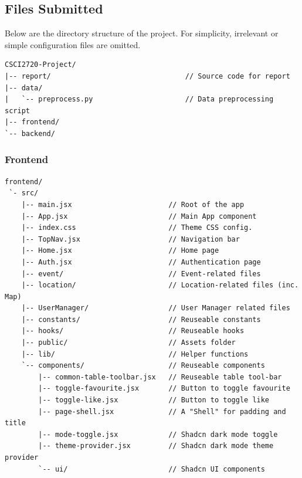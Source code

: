\subsection{Files Submitted}
Below are the directory structure of the project.
For simplicity, irrelevant or simple configuration files are omitted.
\begin{verbatim}
CSCI2720-Project/
|-- report/                                // Source code for report
|-- data/
|   `-- preprocess.py                      // Data preprocessing script
|-- frontend/
`-- backend/
\end{verbatim}

\subsubsection{Frontend}
\begin{verbatim}
frontend/
 `- src/
    |-- main.jsx                       // Root of the app
    |-- App.jsx                        // Main App component
    |-- index.css                      // Theme CSS config.
    |-- TopNav.jsx                     // Navigation bar
    |-- Home.jsx                       // Home page
    |-- Auth.jsx                       // Authentication page
    |-- event/                         // Event-related files
    |-- location/                      // Location-related files (inc. Map)
    |-- UserManager/                   // User Manager related files
    |-- constants/                     // Reuseable constants
    |-- hooks/                         // Reuseable hooks
    |-- public/                        // Assets folder
    |-- lib/                           // Helper functions
    `-- components/                    // Reuseable components
        |-- common-table-toolbar.jsx   // Reuseable table tool-bar
        |-- toggle-favourite.jsx       // Button to toggle favourite
        |-- toggle-like.jsx            // Button to toggle like
        |-- page-shell.jsx             // A "Shell" for padding and title
        |-- mode-toggle.jsx            // Shadcn dark mode toggle
        |-- theme-provider.jsx         // Shadcn dark mode theme provider
        `-- ui/                        // Shadcn UI components
\end{verbatim}

